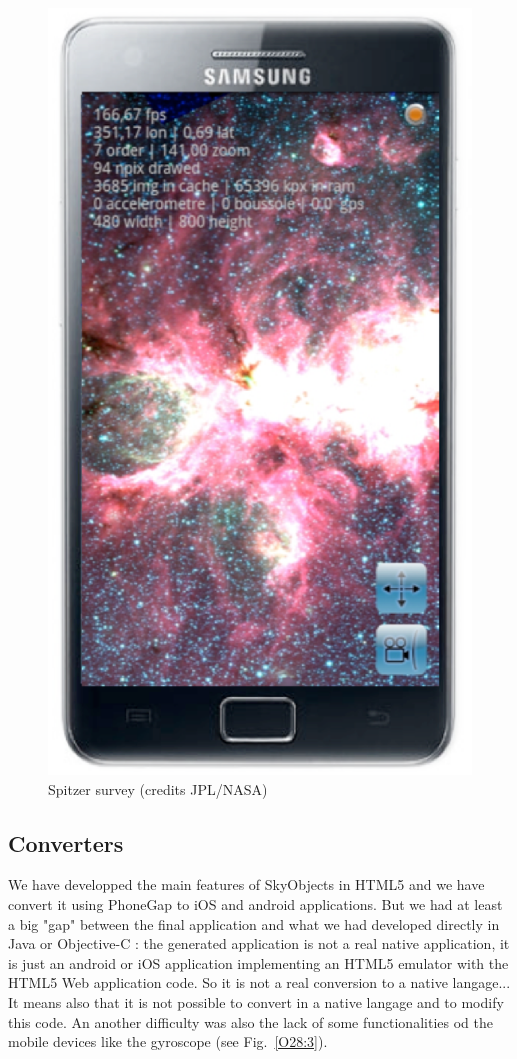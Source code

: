 \documentclass[11pt,twoside]{article}
\begin{document}
\begin{figure}[h]
\includegraphics[scale=0.28]{O28_f3.eps}
\caption{Spitzer survey (credits JPL/NASA)} 
\label{O28:2}
\end{figure}

\subsection{Converters}
We have developped the main features of SkyObjects in HTML5 and we have convert it using PhoneGap to iOS and android applications. But we had at least a big "gap" between the final application and what we had developed directly in Java or Objective-C : the generated application is not a real native application, it is just an android or iOS application implementing an HTML5 emulator with the HTML5 Web application code. So it is not a real conversion to a native langage... 
It means also that it is not possible to convert in a native langage and to modify this code.
An another difficulty was also the lack of some functionalities od the mobile devices like the gyroscope  (see Fig.~\ref{O28:3}).
\end{document}
